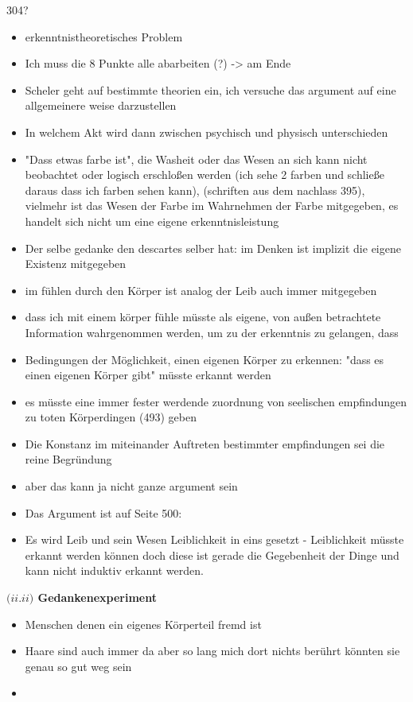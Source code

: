 \documentclass[a4paper, 12pt]{article}
\begin{document}
\begin{onehalfspace}
304? 

\begin{itemize}
  \item erkenntnistheoretisches Problem
  \item Ich muss die 8 Punkte alle abarbeiten (?) -> am Ende
  \item Scheler geht auf bestimmte theorien ein, ich versuche das argument auf eine allgemeinere weise darzustellen
  \item In welchem Akt wird dann zwischen psychisch und physisch unterschieden
  \item "Dass etwas farbe ist", die Washeit oder das Wesen an sich kann nicht beobachtet oder logisch erschloßen werden (ich sehe 2 farben und schließe daraus dass ich farben sehen kann), (schriften aus dem nachlass 395), vielmehr ist das Wesen der Farbe im Wahrnehmen der Farbe mitgegeben, es handelt sich nicht um eine eigene erkenntnisleistung
  \item Der selbe gedanke den descartes selber hat: im Denken ist implizit die eigene Existenz mitgegeben
  \item im fühlen durch den Körper ist analog der Leib auch immer mitgegeben
  \item dass ich mit einem körper fühle müsste als eigene, von außen betrachtete Information wahrgenommen werden, um zu der erkenntnis zu gelangen, dass 
  \item Bedingungen der Möglichkeit, einen eigenen Körper zu erkennen: "dass es einen eigenen Körper gibt" müsste erkannt werden
  \item es müsste eine immer fester werdende zuordnung von seelischen empfindungen zu toten Körperdingen (493) geben
  \item Die Konstanz im miteinander Auftreten bestimmter empfindungen sei die reine Begründung
  \item aber das kann ja nicht ganze argument sein
  \item Das Argument ist auf Seite 500:
  \item Es wird Leib und sein Wesen Leiblichkeit in eins gesetzt - Leiblichkeit müsste erkannt werden können doch diese ist gerade die Gegebenheit der Dinge und kann nicht induktiv erkannt werden.
\end{itemize}

\vspace{3mm}
\noindent\textbf{$(ii.$\footnotesize$ii$\normalsize$)$ Gedankenexperiment}

\begin{itemize}
  \item Menschen denen ein eigenes Körperteil fremd ist
  \item Haare sind auch immer da aber so lang mich dort nichts berührt könnten sie genau so gut weg sein
  \item 
\end{itemize}



\end{onehalfspace}
\end{document}
